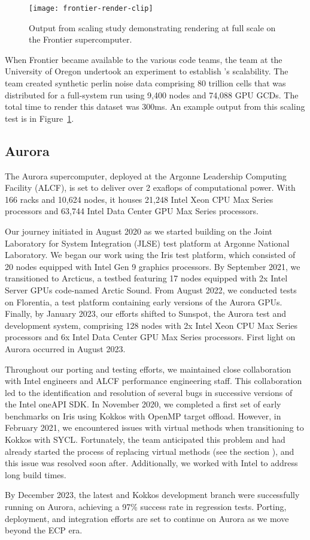 \begin{figure}[htb]
  \texttt{[image: frontier-render-clip]}
  \caption{
    Output from \vtkm scaling study demonstrating rendering at full scale on the Frontier supercomputer.
  }
  \label{fig:frontier-render}
\end{figure}

When Frontier became available to the various code teams, the \vtkm team at the University of Oregon undertook an experiment to establish \vtkm's scalability.
The team created synthetic perlin noise data comprising 80 trillion cells that was distributed for a full-system run using 9,400 nodes and 74,088 GPU GCDs.
The total time to render this dataset was 300ms.
An example output from this scaling test is in Figure~\ref{fig:frontier-render}.


\subsection{Aurora}


The Aurora supercomputer, deployed at the Argonne Leadership Computing Facility (ALCF), is set to deliver over 2 exaflops of computational power. With 166 racks and 10,624 nodes, it houses 21,248 Intel Xeon CPU Max Series processors and 63,744 Intel Data Center GPU Max Series processors.

Our journey initiated in August 2020 as we started building \vtkm on the Joint Laboratory for System Integration (JLSE) test platform at Argonne National Laboratory.
We began our work using the Iris test platform, which consisted of 20 nodes equipped with Intel Gen 9 graphics processors.
By September 2021, we transitioned to Arcticus, a testbed featuring 17 nodes equipped with 2x Intel Server GPUs code-named Arctic Sound.
From August 2022, we conducted tests on Florentia, a test platform containing early versions of the Aurora GPUs.
Finally, by January 2023, our efforts shifted to Sunspot, the Aurora test and development system, comprising 128 nodes with 2x Intel Xeon CPU Max Series processors and 6x Intel Data Center GPU Max Series processors.
First light on Aurora occurred in August 2023.

Throughout our porting and testing efforts, we maintained close collaboration with Intel engineers and ALCF performance engineering staff. This collaboration led to the identification and resolution of several bugs in successive versions of the Intel oneAPI SDK. In November 2020, we completed a first set of early \vtkm benchmarks on Iris using Kokkos with OpenMP target offload. However, in February 2021, we encountered issues with virtual methods when transitioning to Kokkos with SYCL. Fortunately, the team anticipated this problem and had already started the process of replacing virtual methods (see the section ), and this issue was resolved soon after. Additionally, we worked with Intel to address long build times.

By December 2023, the latest \vtkm and Kokkos development branch were successfully running on Aurora, achieving a 97\% success rate in regression tests. Porting, deployment, and integration efforts are set to continue on Aurora as we move beyond the ECP era.
